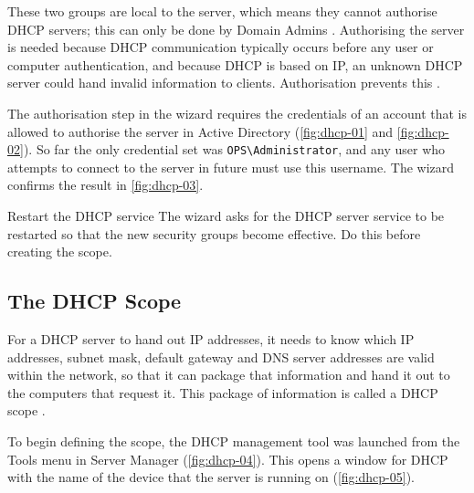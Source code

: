 These two groups are local to the server, which means they cannot authorise DHCP servers; this can only be done by Domain Admins \cite{dhcp-groups}. Authorising the server is needed because DHCP communication typically occurs before any user or computer authentication, and because DHCP is based on IP, an unknown DHCP server could hand invalid information to clients. Authorisation prevents this \cite{msnoob-dhcp}.

The authorisation step in the wizard requires the credentials of an account that is allowed to authorise the server in Active Directory (\autoref{fig:dhcp-01} and \autoref{fig:dhcp-02}). So far the only credential set was \texttt{OPS\textbackslash Administrator}, and any user who attempts to connect to the server in future must use this username. The wizard confirms the result in \autoref{fig:dhcp-03}.


\begin{callout}{Restart the DHCP service}
The wizard asks for the DHCP server service to be restarted so that the new security groups become effective. Do this before creating the scope.
\end{callout}

\subsection{The DHCP Scope}
\label{sec:dhcp-scope}
For a DHCP server to hand out IP addresses, it needs to know which IP addresses, subnet mask, default gateway and DNS server addresses are valid within the network, so that it can package that information and hand it out to the computers that request it. This package of information is called a DHCP scope \cite{krause2019}.

To begin defining the scope, the DHCP management tool was launched from the Tools menu in Server Manager (\autoref{fig:dhcp-04}). This opens a window for DHCP with the name of the device that the server is running on (\autoref{fig:dhcp-05}).


